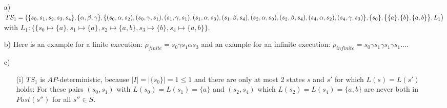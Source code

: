 \documentclass[a4paper,11pt]{scrartcl}
\begin{document}
	\begin{itemize}
		\item[a)] $ TS_1 = \bigl( \{s_0, s_1, s_2, s_3, s_4\}, \{\alpha,\beta, \gamma\}, \\
		\{ (s_0, \alpha, s_2), (s_0, \gamma, s_1), (s_1, \gamma, s_1), (s_1, \alpha, s_3), (s_1, \beta, s_4), (s_2, \alpha, s_0), (s_2, \beta, s_4), (s_4, \alpha, s_2), (s_4, \gamma, s_3)\},\\
		\{s_0\}, \bigl\{ \{a\}, \{b\}, \{a,b\} \bigr\}, L_1 \bigr)$\\
		with $L_1: \bigl\{ \{s_0 \mapsto \{a\}, s_1 \mapsto \{a\}, s_2 \mapsto \{a,b\}, s_3 \mapsto \{b\}, s_4 \mapsto \{a,b\} \bigr\}$.
		\item[b)] Here is an example for a finite execution: $\rho_{finite} = s_0 \gamma s_1 \alpha s_3$ and an example for an infinite execution: $\rho_{infinite} = s_0 \gamma s_1 \gamma s_1 \gamma s_1 \dots$.
		\item[c)]
		\begin{itemize}
			\item[(i)] $TS_1$ is $AP$-deterministic, because $\mid I \mid = \mid \{s_0\} \mid = 1 \leq 1$ and there are only at most 2 states $s$ and $s'$ for which $L(s)=L(s')$ holds: For these pairs $(s_0, s_1)$ with $L(s_0)=L(s_1)=\{a\}$ and $(s_2, s_4)$ which $L(s_2)=L(s_4)=\{a, b\}$ are never both in $Post(s'')$ for all $s'' \in S$.
			

\end{itemize}
\end{itemize}
\end{document}
